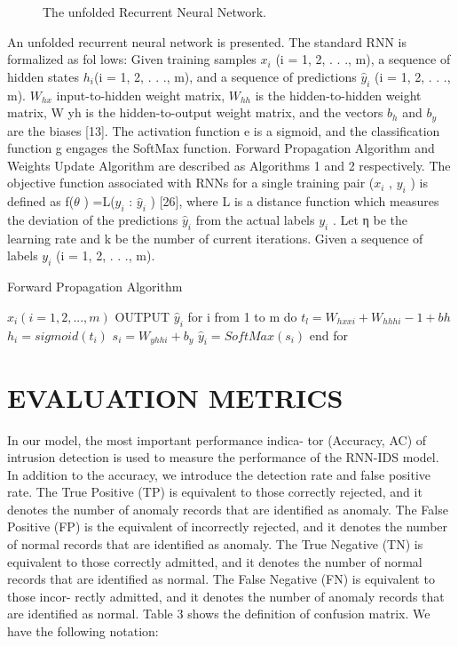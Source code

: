 \documentclass[12pt]{report}	%
\newcommand{\squeezeup}{\vspace{-0.6cm}}
\begin{document}
\begin{figure}[!h]
	\captionsetup{font=scriptsize}
	\begin{center}
		\centerline{}
		\caption{The unfolded Recurrent Neural Network.}
		\label{fig:7}
	\end{center}
	\squeezeup
\end{figure}
An unfolded recurrent neural network
is presented. The standard RNN is formalized as fol
lows: Given training samples $x_{i} $ (i = 1, 2, . . ., m), a sequence
of hidden states $ h_{i}$(i = 1, 2, . . ., m), and a sequence of
predictions $\hat{y}_i$ (i = 1, 2, . . ., m). $ W_{hx} $  input-to-hidden
weight matrix, $ W_{hh} $ is the hidden-to-hidden weight matrix,
W yh is the hidden-to-output weight matrix, and the vectors $ b_{h} $
and $b_{y}$ are the biases [13]. The activation function e is a sigmoid, and the classification function g engages the SoftMax
function.
Forward Propagation Algorithm
and Weights Update Algorithm are described as Algorithms 1
and 2 respectively.
The objective function associated with RNNs for a single
training pair ($x_{i}$ , $y_{i}$ ) is defined as f($\theta$ ) =L($y_{i} $ : $ \hat{y}_i$ ) [26],
where L is a distance function which measures the deviation
of the predictions $ \hat{y}_i$ from the actual labels $ y_{i}$ . Let η be the
learning rate and k be the number of current iterations. Given
a sequence of labels $y_{i}$ (i = 1, 2, . . ., m).
\begin{algorithm}[!h]
	\caption{Forward Propagation Algorithm}
	\label{alg1}
	\begin{algorithmic}[1]
		\REQUIRE $ x_{i}(i=1,2,...,m) $
		OUTPUT $ \hat{y}_{i} $
		\STATE for i from 1 to m do
		\STATE 		$ t_{l}=W_{hxxi} + W_{hhhi}-1 +bh $ 
		\STATE $ h_{i}=sigmoid(t_{i}) $
		\STATE $ s_{i}=W_{yhhi} +b_{y} $
		\STATE $\hat{y}_{i}=SoftMax(s_{i})$
		\STATE end for
	\end{algorithmic}
\end{algorithm}




\section{EVALUATION METRICS}
In our model, the most important performance indica-
tor (Accuracy, AC) of intrusion detection is used to measure
the performance of the RNN-IDS model. In addition to the
accuracy, we introduce the detection rate and false positive
rate. The True Positive (TP) is equivalent to those correctly
rejected, and it denotes the number of anomaly records that
are identified as anomaly. The False Positive (FP) is the
equivalent of incorrectly rejected, and it denotes the number
of normal records that are identified as anomaly. The True
Negative (TN) is equivalent to those correctly admitted, and
it denotes the number of normal records that are identified as
normal. The False Negative (FN) is equivalent to those incor-
rectly admitted, and it denotes the number of anomaly records
that are identified as normal. Table 3 shows the definition of
confusion matrix. We have the following notation:
\end{document}
